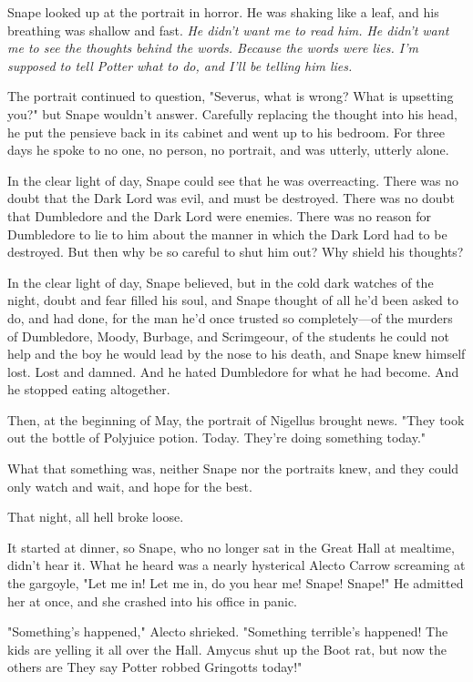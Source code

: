 Snape looked up at the portrait in horror. He was shaking like a leaf, and his breathing was shallow and fast. \emph{He didn't want me to read him. He didn't want me to see the thoughts behind the words. Because the words were lies. I'm supposed to tell Potter what to do, and I'll be telling him lies.}

The portrait continued to question, "Severus, what is wrong? What is upsetting you?" but Snape wouldn't answer. Carefully replacing the thought into his head, he put the pensieve back in its cabinet and went up to his bedroom. For three days he spoke to no one, no person, no portrait, and was utterly, utterly alone.

In the clear light of day, Snape could see that he was overreacting. There was no doubt that the Dark Lord was evil, and must be destroyed. There was no doubt that Dumbledore and the Dark Lord were enemies. There was no reason for Dumbledore to lie to him about the manner in which the Dark Lord had to be destroyed. But then why be so careful to shut him out? Why shield his thoughts?

In the clear light of day, Snape believed, but in the cold dark watches of the night, doubt and fear filled his soul, and Snape thought of all he'd been asked to do, and had done, for the man he'd once trusted so completely—of the murders of Dumbledore, Moody, Burbage, and Scrimgeour, of the students he could not help and the boy he would lead by the nose to his death, and Snape knew himself lost. Lost and damned. And he hated Dumbledore for what he had become. And he stopped eating altogether.

Then, at the beginning of May, the portrait of Nigellus brought news. "They took out the bottle of Polyjuice potion. Today. They're doing something today."

What that something was, neither Snape nor the portraits knew, and they could only watch and wait, and hope for the best.

That night, all hell broke loose.

It started at dinner, so Snape, who no longer sat in the Great Hall at mealtime, didn't hear it. What he heard was a nearly hysterical Alecto Carrow screaming at the gargoyle, "Let me in! Let me in, do you hear me! Snape! Snape!" He admitted her at once, and she crashed into his office in panic.

"Something's happened," Alecto shrieked. "Something terrible's happened! The kids are yelling it all over the Hall. Amycus shut up the Boot rat, but now the others are{\el} They say Potter robbed Gringotts today!"


